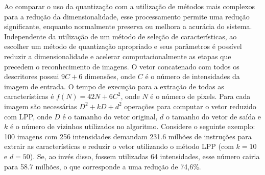 Ao comparar o uso da quantização com a utilização de métodos mais complexos para a redução da dimensionalidade, esse processamento permite uma redução significante, enquanto normalmente preserva ou melhora a acurácia do sistema. Independente da utilização de um método de seleção de características, ao escolher um método de quantização apropriado e seus parâmetros é possível reduzir a dimensionalidade e acelerar computacionalmente as etapas que precedem o reconhecimento de imagens. O vetor concatenado com todos os descritores possui $9C + 6$ dimensões, onde $C$ é o número de intensidades da imagem de entrada. O tempo de execução para a extração de todas as características é $f(N) = 42N + 6C^2$, onde $N$ é o número de pixels. Para cada imagem são necessárias $D^2 + kD + d^2$ operações para computar o vetor reduzido com LPP, onde $D$ é o tamanho do vetor original, $d$ o tamanho do vetor de saída e $k$ é o número de vizinhos utilizados no algoritmo. Considere o seguinte exemplo: 100 imagens com 256 intensidades demandam 231.6 milhões de instruções para extrair as características e reduzir o vetor utilizando o método LPP (com $k = 10$ e $d = 50$). Se, ao invés disso, fossem utilizadas 64 intensidades, esse número cairia para 58.7 milhões, o que corresponde a uma redução de 74,6\%.
